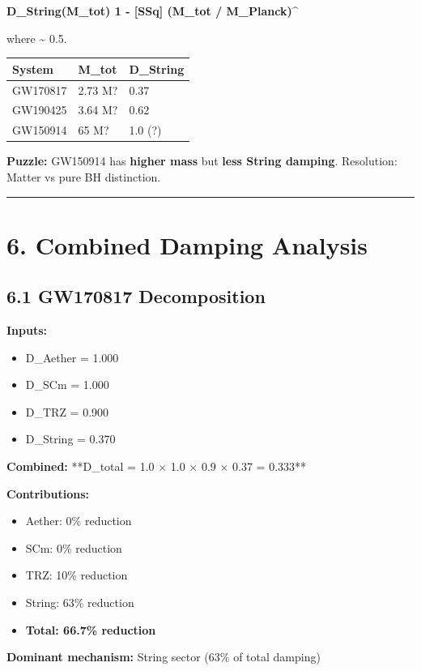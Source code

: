 \documentclass[11pt]{article}
\begin{document}
\textbf{D\_String(M\_tot)  1 - [SSq]  (M\_tot / M\_Planck)\textasciicircum{}}

where  \textasciitilde{} 0.5.

\begin{center}
\begin{longtable}{lll}
\toprule
System & M\_tot & D\_String \tabularnewline
\midrule
\endhead
GW170817 & 2.73 M? & 0.37 \tabularnewline
GW190425 & 3.64 M? & 0.62 \tabularnewline
GW150914 & 65 M? & 1.0 (?) \tabularnewline
\bottomrule
\end{longtable}
\end{center}

\textbf{Puzzle:} GW150914 has \textbf{higher mass} but \textbf{less String damping}. Resolution: Matter vs pure BH distinction.

\noindent\rule{\textwidth}{0.4pt}

\section*{6. Combined Damping Analysis}

\subsection*{6.1 GW170817 Decomposition}

\textbf{Inputs:}

\begin{itemize}
  \item D\_Aether = 1.000
  \item D\_SCm = 1.000
  \item D\_TRZ = 0.900
  \item D\_String = 0.370
\end{itemize}

\textbf{Combined:} **D\_total = 1.0 $\times$ 1.0 $\times$ 0.9 $\times$ 0.37 = 0.333**

\textbf{Contributions:}

\begin{itemize}
  \item Aether: 0\% reduction
  \item SCm: 0\% reduction
  \item TRZ: 10\% reduction
  \item String: 63\% reduction
  \item \textbf{Total: 66.7\% reduction}
\end{itemize}

\textbf{Dominant mechanism:} String sector (63\% of total damping)
\end{document}
